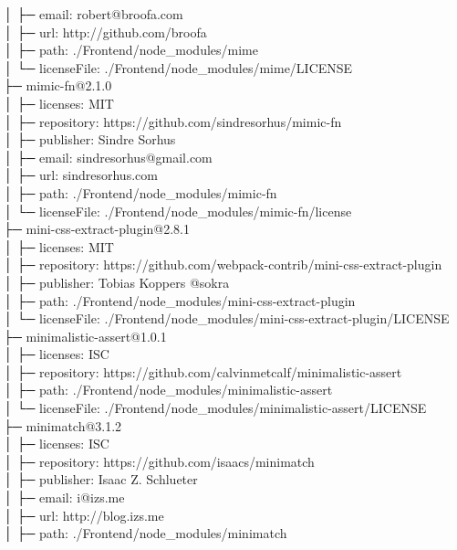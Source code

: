 \documentclass[
    paper=a4,
    twoside=false,
    parskip=half,
    listof=entryprefix,
    listof=totoc,
    index=totoc,
    bibliography=totoc,
    headsepline,
]{scrbook}
\begin{document}
    │  ├─ email: robert@broofa.com\\
    │  ├─ url: http://github.com/broofa\\
    │  ├─ path: ./Frontend/node\_modules/mime\\
    │  └─ licenseFile: ./Frontend/node\_modules/mime/LICENSE\\
    ├─ mimic-fn@2.1.0\\
    │  ├─ licenses: MIT\\
    │  ├─ repository: https://github.com/sindresorhus/mimic-fn\\
    │  ├─ publisher: Sindre Sorhus\\
    │  ├─ email: sindresorhus@gmail.com\\
    │  ├─ url: sindresorhus.com\\
    │  ├─ path: ./Frontend/node\_modules/mimic-fn\\
    │  └─ licenseFile: ./Frontend/node\_modules/mimic-fn/license\\
    ├─ mini-css-extract-plugin@2.8.1\\
    │  ├─ licenses: MIT\\
    │  ├─ repository: https://github.com/webpack-contrib/mini-css-extract-plugin\\
    │  ├─ publisher: Tobias Koppers @sokra\\
    │  ├─ path: ./Frontend/node\_modules/mini-css-extract-plugin\\
    │  └─ licenseFile: ./Frontend/node\_modules/mini-css-extract-plugin/LICENSE\\
    ├─ minimalistic-assert@1.0.1\\
    │  ├─ licenses: ISC\\
    │  ├─ repository: https://github.com/calvinmetcalf/minimalistic-assert\\
    │  ├─ path: ./Frontend/node\_modules/minimalistic-assert\\
    │  └─ licenseFile: ./Frontend/node\_modules/minimalistic-assert/LICENSE\\
    ├─ minimatch@3.1.2\\
    │  ├─ licenses: ISC\\
    │  ├─ repository: https://github.com/isaacs/minimatch\\
    │  ├─ publisher: Isaac Z. Schlueter\\
    │  ├─ email: i@izs.me\\
    │  ├─ url: http://blog.izs.me\\
    │  ├─ path: ./Frontend/node\_modules/minimatch\\
\end{document}
